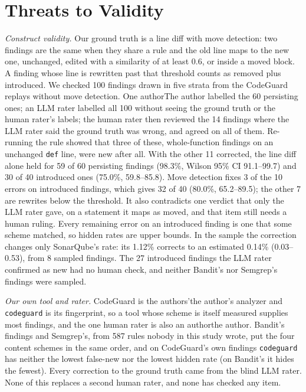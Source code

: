\section{Threats to Validity}\label{sec:threats}

\textit{Construct validity.} Our ground truth is a line diff with move detection: two findings are the same when they share a rule and the old line maps to the new one, unchanged, edited with a similarity of at least 0.6, or inside a moved block. A finding whose line is rewritten past that threshold counts as removed plus introduced. We checked 100 findings drawn in five strata from the CodeGuard replays without move detection. \ifanon One author\else The author\fi{} labelled the 60 persisting ones; an LLM rater labelled all 100 without seeing the ground truth or the human rater's labels; the human rater then reviewed the 14 findings where the LLM rater said the ground truth was wrong, and agreed on all of them. Re-running the rule showed that three of these, whole-function findings on an unchanged \texttt{def} line, were new after all. With the other 11 corrected, the line diff alone held for 59 of 60 persisting findings (98.3\%, Wilson 95\% CI 91.1--99.7) and 30 of 40 introduced ones (75.0\%, 59.8--85.8). Move detection fixes 3 of the 10 errors on introduced findings, which gives 32 of 40 (80.0\%, 65.2--89.5); the other 7 are rewrites below the threshold. It also contradicts one verdict that only the LLM rater gave, on a statement it maps as moved, and that item still needs a human ruling. Every remaining error on an introduced finding is one that some scheme matched, so hidden rates are upper bounds. In the sample the correction changes only SonarQube's rate: its 1.12\% corrects to an estimated 0.14\% (0.03--0.53), from 8 sampled findings. The 27 introduced findings the LLM rater confirmed as new had no human check, and neither Bandit's nor Semgrep's findings were sampled.

\textit{Our own tool and rater.} CodeGuard is \ifanon the authors'\else the author's\fi{} analyzer and \texttt{codeguard} is its fingerprint, so a tool whose scheme is itself measured supplies most findings, and the one human rater is also \ifanon an author\else the author\fi. Bandit's findings and Semgrep's, from 587 rules nobody in this study wrote, put the four content schemes in the same order, and on CodeGuard's own findings \texttt{codeguard} has neither the lowest false-new nor the lowest hidden rate (on Bandit's it hides the fewest). Every correction to the ground truth came from the blind LLM rater. None of this replaces a second human rater, and none has checked any item.

